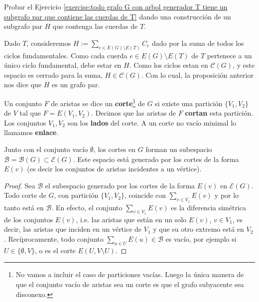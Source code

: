 \documentclass[../main.tex]{subfiles}
\begin{document}
\begin{exercise}
Probar el Ejercicio \ref{exercise:todo grafo G con arbol generador T tiene un subgrafo par que contiene las cuerdas de T} dando una construcción de un subgrafo par $H$ que contenga las cuerdas de $T$.
\end{exercise}
\begin{solution}
Dado $T$, consideremos $H := \sum_{e \in E(G) \setminus E(T)} C_e$ dado por la suma de todos los ciclos fundamentales. Como cada cuerda $e \in E(G) \setminus E(T)$ de $T$ pertenece a un único ciclo fundamental, debe estar en $H$. Como los ciclos estan en $\mathcal C (G)$, y este espacio es cerrado para la suma, $H \in \mathcal C(G)$. Con lo cual, la proposición anterior nos dice que $H$ es un grafo par.
\end{solution}

\begin{definition}
Un conjunto $F$ de aristas se dice un \textbf{corte}\footnote{No vamos a incluir el caso de particiones vacías. Luego la única manera de que el conjunto vacío de aristas sea un corte es que el grafo subyacente sea disconexo.}
 de $G$ si existe una partición $\{V_1,V_2\}$ de $V$ tal que $F = E(V_1,V_2)$. Decimos que las aristas de $F$ \textbf{cortan} esta partición. Los conjuntos $V_1,V_2$ son los \textbf{lados} del corte. A un corte no vacío minimal lo llamamos \textbf{enlace}.
\end{definition}

\begin{proposition}
Junto con el conjunto vacío $\emptyset$, los cortes en $G$ forman un subespacio $\mathcal B = \mathcal B ( G) \subset \mathcal{E}(G)$. Este espacio está generado por los cortes de la forma $E(v)$ (es decir los conjuntos de aristas incidentes a un vértice).
\end{proposition}
\begin{proof}
Sea $\mathcal B$ el subespacio generado por los cortes de la forma $E(v)$ en $\mathcal{E} (G)$. Todo corte de $G$, con partición $\{ V_1 , V_2 \}$, coincide con $\sum_{v \in V_1} E(v)$ y por lo tanto está en $\mathcal{B}$. En efecto, el conjunto $\sum_{v \in V_1} E(v)$ es la diferencia simétrica de los conjuntos $E(v)$, i.e. las aristas que están en un solo $E(v)$, $v  \in V_1$, es decir, las aristas que inciden en un vértice de $V_1$ y que su otro extremo está en $V_2$. Recíprocamente, todo conjunto $\sum_{u \in U}E(u) \in \mathcal{B}$ es vacío, por ejemplo si $U \in \{ \emptyset , V \}$, o es el corte $E(U, V \setminus U)$.
\end{proof}
\end{document}
